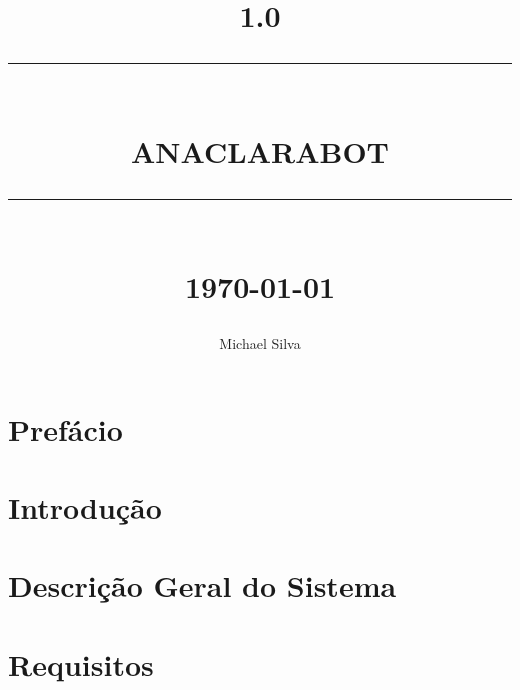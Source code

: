 \documentclass[12pt]{report}
\newcommand{\HRule}[1]{\rule{\linewidth}{#1}}
\begin{document}
\title{ \normalsize \textsc{1.0}
		\\ [2.0cm]
		\HRule{0.5pt} \\
		\LARGE \textbf{\uppercase{AnaclaraBot}}
		\HRule{2pt} \\ [0.5cm]
		\normalsize \today \vspace*{5\baselineskip}}

\date{}

\author{
		Michael Silva}

\maketitle
\tableofcontents
\newpage

\sectionfont{\scshape}




\section*{Prefácio}
\setlength{\parindent}{10ex}




\newpage
\section*{Introdução}
\setlength{\parindent}{10ex}




\newpage
\section*{Descrição Geral do Sistema}





\newpage
\section*{Requisitos}
\end{document}
